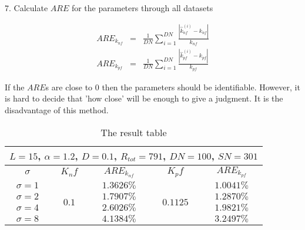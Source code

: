 \documentclass[12pt]{extarticle}
\begin{document}
7. Calculate $ARE$ for the parameters through all datasets

\begin{equation*}
\begin{array}{rcl}
ARE_{k_{nf}} & = & \frac{1}{DN}\sum_{i=1}^{DN}\frac{\left|\hat{k}_{nf}^{(i)}-k_{nf}\right|}{k_{nf}} \\
ARE_{k_{pf}} & = & \frac{1}{DN}\sum_{i=1}^{DN}\frac{\left|\hat{k}_{pf}^{(i)}-k_{pf}\right|}{k_{pf}}
\end{array}
\end{equation*}

If the $ARE$s are close to 0 then the parameters should be identifiable. However, it is hard to decide that 'how close' will be enough to give a judgment. It is the disadvantage of this method. 

    
\begin{table}
\caption{The result table}
\begin{center}
\begin{tabular}{|c|c|c|c|c|}
\hline
\multicolumn{5}{|c|}{$L=15$, $\alpha=1.2$, $D=0.1$, $R_{tot}=791$, $DN=100$, $SN=301$} \\
\hline
$\sigma$ & $K_nf$ & $ARE_{k_{nf}}$ & $K_pf$ & $ARE_{k_{pf}}$ \\
\hline
$\sigma=1$ & \multirow{4}{*}{$0.1$} & $1.3626\%$ & \multirow{4}{*}{$0.1125$} & $1.0041\%$ \\
$\sigma=2$ &  & $1.7907\%$ &  & $1.2870\%$ \\
$\sigma=4$ &  & $2.6026\%$ &  & $1.9821\%$ \\
$\sigma=8$ &  & $4.1384\%$ &  & $3.2497\%$ \\
\hline
\end{tabular}
\end{center}
\end{table}
\end{document}
